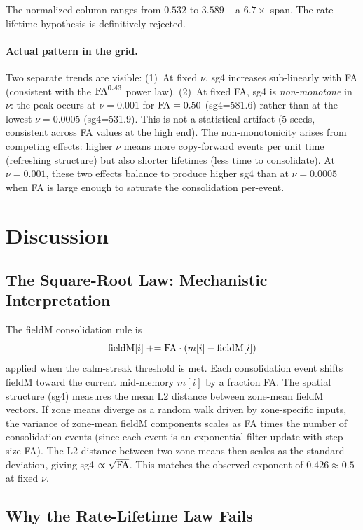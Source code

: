 \documentclass[11pt]{article}
\begin{document}
The normalized column ranges from $0.532$ to $3.589$ -- a $6.7\times$ span.
The rate-lifetime hypothesis is definitively rejected.

\paragraph{Actual pattern in the grid.}
Two separate trends are visible:
(1)~At fixed $\nu$, sg4 increases sub-linearly with FA (consistent with
the ${\rm FA}^{0.43}$ power law).
(2)~At fixed FA, sg4 is \emph{non-monotone} in $\nu$: the peak occurs at
$\nu = 0.001$ for ${\rm FA} = 0.50$ (sg4=581.6) rather than at the
lowest $\nu = 0.0005$ (sg4=531.9).
This is not a statistical artifact (5 seeds, consistent across FA values
at the high end).
The non-monotonicity arises from competing effects: higher $\nu$ means
more copy-forward events per unit time (refreshing structure) but also
shorter lifetimes (less time to consolidate).
At $\nu=0.001$, these two effects balance to produce higher sg4 than at
$\nu=0.0005$ when FA is large enough to saturate the consolidation
per-event.

\section{Discussion}

\subsection{The Square-Root Law: Mechanistic Interpretation}

The fieldM consolidation rule is
\[
{\rm fieldM}[i] \mathrel{+}= {\rm FA} \cdot (m[i] - {\rm fieldM}[i])
\]
applied when the calm-streak threshold is met.
Each consolidation event shifts fieldM toward the current mid-memory
$m[i]$ by a fraction FA.
The spatial structure (sg4) measures the mean L2 distance between
zone-mean fieldM vectors.
If zone means diverge as a random walk driven by zone-specific inputs,
the variance of zone-mean fieldM components scales as FA times the number
of consolidation events (since each event is an exponential filter update
with step size FA).
The L2 distance between two zone means then scales as the standard deviation,
giving sg4 $\propto \sqrt{{\rm FA}}$.
This matches the observed exponent of $0.426 \approx 0.5$ at fixed $\nu$.

\subsection{Why the Rate-Lifetime Law Fails}
\end{document}
